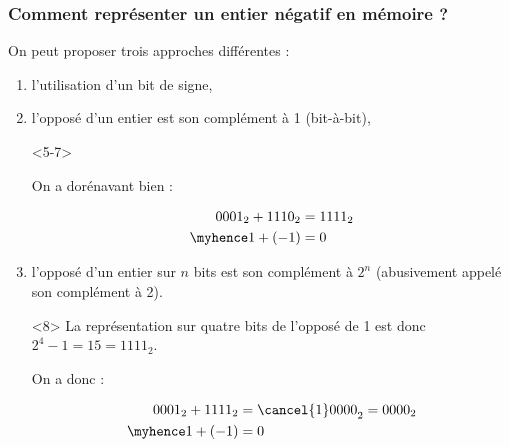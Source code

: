 \documentclass{cppcourses}
\begin{document}
\begin{frame}

\frametitle{Comment représenter un entier négatif en mémoire ?}

On peut proposer trois approches différentes :

\begin{enumerate}

    \item<2-> l'utilisation d'un bit de signe,


    \item<4-> l'opposé d'un entier est son complément à 1 (bit-à-bit),

    \begin{onlyenv}<5-7>

    On a dorénavant bien :

    \begin{align*}
        \begin{split}
    {0001}_2 + {1110}_2 &= {1111}_2 \\
    \myhence 1 + (-1) &= 0
        \end{split}
    \end{align*}

    \end{onlyenv}


     \item<7- | alert@9-> l'opposé d'un entier sur \( n \) bits est son complément à \( 2^n \) (abusivement appelé son complément à 2).

\begin{onlyenv}<8>
La représentation sur quatre bits de l'opposé de 1 est donc \( 2^4 - 1 = 15 = {1111}_2 \).

On a donc :

\begin{align*}
    \begin{split}
{0001}_2 + {1111}_2 &= {\cancel{1}0000}_2 = {0000}_2 \\
\myhence 1 + (-1) &= 0
    \end{split}
\end{align*}


\end{onlyenv}
\end{enumerate}
\end{frame}
\end{document}
